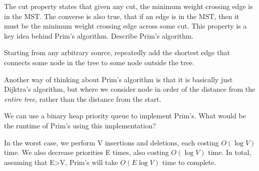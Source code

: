 \begin{blocksection}
The cut property states that given any cut, the minimum weight crossing edge is in the MST. The converse is also true, that if an edge is in the MST, then it must be the minimum weight crossing edge across some cut. This property is a key idea behind Prim's algorithm.
\question Describe Prim's algorithm.

\begin{solution}[0.5in]
Starting from any arbitrary source, repeatedly add the shortest edge that
connects some node in the tree to some node outside the tree.

Another way of thinking about Prim's algorithm is that it is basically just
Dijktra's algorithm, but where we consider node in order of the distance from the
\emph{entire tree}, rather than the distance from the start.
\end{solution}

\question We can use a binary heap priority queue to implement Prim's. What would be the runtime of Prim's using this implementation?  
\begin{solution}[0.75in]
In the worst case, we perform V insertions and deletions, each costing $O(\log V)$ time. We also decrease priorities E times, also costing $O(\log V)$ time. In total, assuming that E\textgreater  V, Prim's will take $O(E \log V)$ time to complete.

\end{solution}
\end{blocksection}